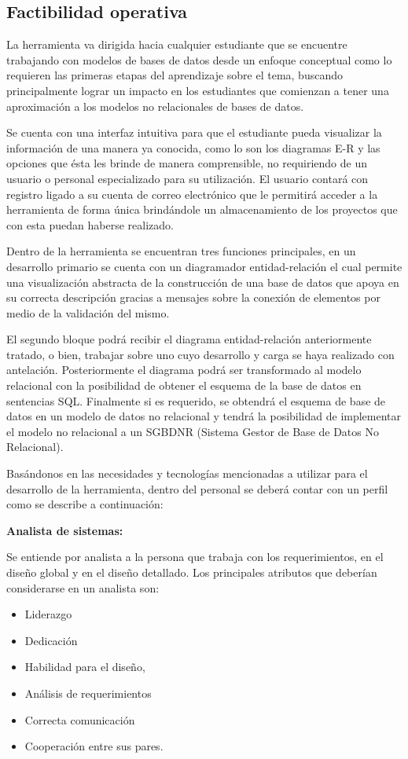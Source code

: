 
\subsection*{Factibilidad operativa}
La herramienta va dirigida hacia cualquier estudiante que se encuentre trabajando con modelos de bases de datos desde un enfoque conceptual como lo requieren las primeras etapas del aprendizaje sobre el tema, buscando principalmente lograr un  impacto en los estudiantes que comienzan a tener una aproximación a los modelos no relacionales de bases de datos.

Se cuenta con una interfaz intuitiva para que el estudiante pueda visualizar la información de una manera ya conocida, como lo son los diagramas E-R y las opciones que ésta les brinde de manera comprensible, no requiriendo de un usuario o personal especializado para su utilización.
El usuario contará con registro ligado a su cuenta de correo electrónico que le permitirá acceder a la herramienta de forma única brindándole un almacenamiento de los proyectos que con esta puedan haberse realizado.

Dentro de la herramienta se encuentran tres funciones principales, en un desarrollo primario se cuenta con un diagramador entidad-relación el cual permite una visualización abstracta de la construcción de una base de datos que apoya en su correcta descripción gracias a mensajes sobre la conexión de elementos por medio de la validación del mismo.

El segundo bloque podrá recibir el diagrama entidad-relación anteriormente tratado, o bien, trabajar sobre uno cuyo desarrollo y carga se haya realizado con antelación. Posteriormente el diagrama podrá ser transformado al modelo relacional con la posibilidad de obtener el esquema de la base de datos en sentencias SQL. 
Finalmente si es requerido, se obtendrá el esquema de base de datos en un modelo de datos no relacional y tendrá la posibilidad de implementar el modelo no relacional a un SGBDNR (Sistema Gestor de Base de Datos No Relacional).

Basándonos en las necesidades y tecnologías mencionadas a utilizar para el desarrollo de la herramienta, dentro del personal se deberá contar con un perfil como se describe a continuación:

\textbf{Analista de sistemas:}

Se entiende por analista a la persona que trabaja con los requerimientos, en el diseño global y en el diseño detallado. 
Los principales atributos que deberían considerarse en un analista son:
\begin{itemize}	
	\item Liderazgo
	\item Dedicación
	\item Habilidad para el diseño, 
	\item Análisis de requerimientos
	\item Correcta comunicación 
	\item Cooperación entre sus pares. 
\end{itemize}

